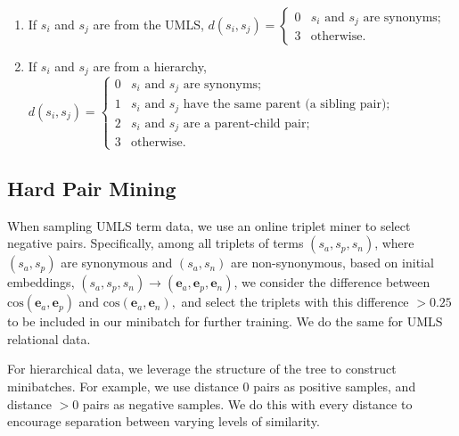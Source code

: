 \documentclass[12pt,a4paper]{cibb}
\begin{document}
\begin{enumerate}
\item If $s_i$ and $s_j$ are from the UMLS, 
$d(s_i, s_j) = 
\begin{cases}
0  & \text{$s_i$ and $s_j$ are synonyms;} \\
3  & \text{otherwise.}
\end{cases}$
\item If $s_i$ and $s_j$ are from a hierarchy, 
$d(s_i, s_j) = 
\begin{cases}
0  & \text{$s_i$ and $s_j$ are synonyms;} \\
1  & \text{$s_i$ and $s_j$ have the same parent (a sibling pair);} \\
2  & \text{$s_i$ and $s_j$ are a parent-child pair;} \\
3  & \text{otherwise.}
\end{cases}$
\end{enumerate}


\subsection{Hard Pair Mining}
When sampling UMLS term data, we use an online triplet miner to select negative pairs. Specifically, among all triplets of terms $(s_a, s_p, s_n)$, where $(s_a, s_p)$ are synonymous and $(s_a, s_n)$ are non-synonymous, based on initial embeddings, $(s_a, s_p, s_n)\rightarrow (\mathbf{e}_a, \mathbf{e}_p, \mathbf{e}_n)$, we consider the difference between $ \mbox{cos}(\mathbf{e}_a, \mathbf{e}_p)$ and $\mbox{cos}(\mathbf{e}_a, \mathbf{e}_n),$ and select the triplets with this difference $>0.25$ to be included in our minibatch for further training. We do the same for UMLS relational data.


For hierarchical data, we leverage the structure of the tree to construct minibatches. For example, we use distance 0 pairs as positive samples, and distance $>0$ pairs as negative samples. We do this with every distance to encourage separation between varying levels of similarity.
\end{document}
